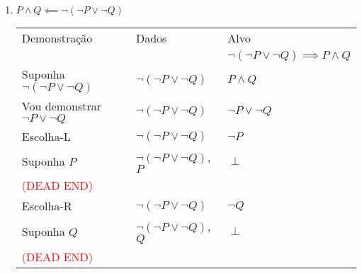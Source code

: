 \documentclass[a4paper, 12pt]{article}
\begin{document}
\begin{enumerate}
\begin{enumerate}[1.]
        \item $P \land Q \impliedby \neg(\neg P \lor \neg Q)$
        \begin{table}[h!]
            \centering
            \begin{tabular}{|p{4cm} | p{4cm} | p{4cm} |}
            \rowcolor{gray!50}
            Demonstração & Dados & Alvo \\
            & & $ \neg(\neg P \lor \neg Q) \implies P \land Q$\\
            Suponha $\neg(\neg P \lor \neg Q)$ & $\neg(\neg P \lor \neg Q)$ & $P \land Q$\\
            \rowcolor{red!25}
            Vou demonstrar $\neg P \lor \neg Q$ & $\neg(\neg P \lor \neg Q)$ &  $\neg P \lor \neg Q$\\
            \rowcolor{red!25}
            \hline 
            Escolha-L & $\neg(\neg P \lor \neg Q)$ & $\neg P$ \\
            \rowcolor{red!25}
            Suponha $P$ & $\neg(\neg P \lor \neg Q)$, $P$ & $\perp$ \\
            \rowcolor{red!25}
            \textcolor{red}{(DEAD END)} & & \\
            \hline
            \rowcolor{red!25}
            Escolha-R & $\neg(\neg P \lor \neg Q)$ & $\neg Q$\\
            \rowcolor{red!25}
            Suponha $Q$ & $\neg(\neg P \lor \neg Q)$, $Q$ & $\perp$ \\
            \rowcolor{red!25}
            \textcolor{red}{(DEAD END)} & & \\
            \hline
            \end{tabular}
        \end{table}
    \end{enumerate}


\end{enumerate}
\end{document}
